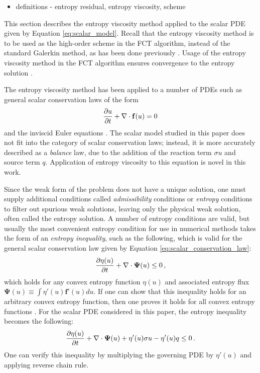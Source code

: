 
\begin{itemize}
  \item definitions - entropy residual, entropy viscosity, scheme
\end{itemize}

This section describes the entropy viscosity method applied to the scalar
PDE given by Equation \eqref{eq:scalar_model}. Recall that the entropy
viscosity method is to be used as the high-order scheme in the FCT algorithm,
instead of the standard Galerkin method, as has been done previously
\cite{kuzmin_FCT}.
Usage of the entropy viscosity method in the FCT algorithm ensures convergence
to the entropy solution \cite{guermond_secondorder}.

The entropy viscosity method has been applied to a number of PDEs
such as general scalar conservation laws of the form
\begin{equation}\label{eq:scalar_conservation_law}
  \frac{\partial u}{\partial t} + \nabla\cdot\mathbf{f}(u) = 0
\end{equation}
and the inviscid Euler equations \cite{guermond_ev}. The scalar model studied
in this paper does not fit into the category of scalar conservation laws;
instead, it is more accurately described as a \emph{balance} law, due to
the addition of the reaction term $\sigma u$ and source term $q$. Application
of entropy viscosity to this equation is novel in this work.

Since the weak form of the problem does not have a unique solution, one
must supply additional conditions called \emph{admissibility} conditions or
\emph{entropy} conditions to filter out spurious weak solutions, leaving
only the physical weak solution, often called the entropy solution.
A number of entropy conditions are valid, but usually the most convenient
entropy condition for use in numerical methods takes the form of an
\emph{entropy inequality}, such as the following, which is valid for the
general scalar conservation law given by Equation \eqref{eq:scalar_conservation_law}:
\begin{equation}
  \frac{\partial \eta(u)}{\partial t} + \nabla\cdot\mathbf{\Psi}(u) \leq 0 \,,
\end{equation}
which holds for any convex entropy function $\eta(u)$ and associated entropy
flux $\mathbf{\Psi}(u) \equiv \int \eta'(u)\mathbf{f}'(u)du$.
If one can show that this inequality holds for an arbitrary
convex entropy function, then one proves it holds for all convex entropy
functions  \cite{leveque2002}\cite{guermond_ev}.
For the scalar PDE considered in this paper, the entropy inequality becomes
the following:
\begin{equation}
  \frac{\partial \eta(u)}{\partial t} + \nabla\cdot\mathbf{\Psi}(u) + \eta'(u)\sigma u - \eta'(u)q
    \leq 0 \,.
\end{equation}
One can verify this inequality by multiplying the governing PDE by $\eta'(u)$
and applying reverse chain rule.

